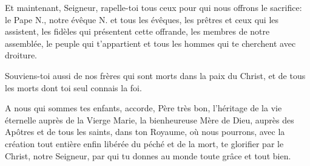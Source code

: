Et maintenant, Seigneur, rapelle-toi
tous ceux pour qui nous offrons le sacrifice:
le Pape N.,
notre évêque N. et tous les évêques,
les prêtres et ceux qui les assistent,
les fidèles qui présentent cette offrande,
les membres de notre assemblée, 
le peuple qui t'appartient
et tous les hommes qui te cherchent avec droiture.

Souviens-toi aussi
de nos frères qui sont morts dans la paix du Christ,
et de tous les morts dont toi seul connais la foi.

A nous qui sommes tes enfants,
accorde, Père très bon,
l'héritage de la vie éternelle
auprès de la Vierge Marie,
la bienheureuse Mère de Dieu,
auprès des Apôtres et de tous les saints,
dans ton Royaume,
où nous pourrons,
avec la création tout entière
enfin libérée du péché et de la mort,
te glorifier
par le Christ, notre Seigneur,
par qui tu donnes au monde
toute grâce et tout bien. 



